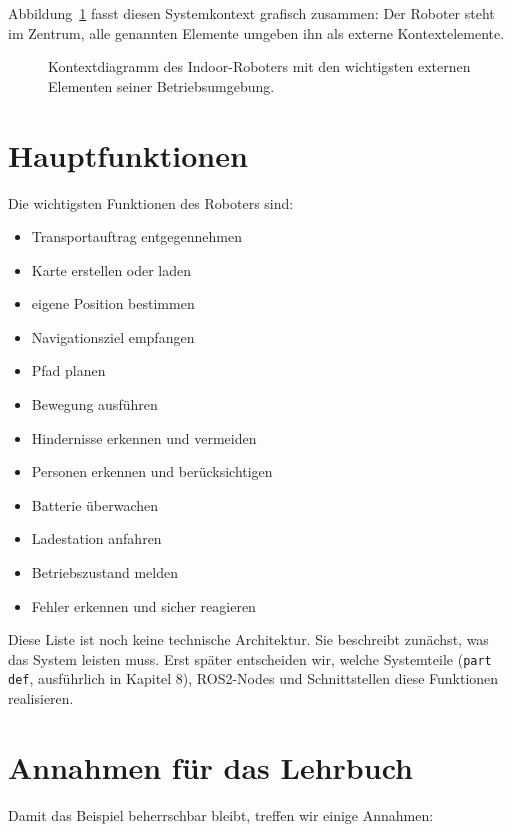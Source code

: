 Abbildung~\ref{fig:kap05-kontextdiagramm} fasst diesen Systemkontext grafisch zusammen: Der Roboter steht im Zentrum, alle genannten Elemente umgeben ihn als externe Kontextelemente.

\begin{figure}[H]
  \centering
  \caption{Kontextdiagramm des Indoor-Roboters mit den wichtigsten externen Elementen seiner Betriebsumgebung.}
  \label{fig:kap05-kontextdiagramm}
\end{figure}

\section{Hauptfunktionen}
Die wichtigsten Funktionen des Roboters sind:

\begin{itemize}
    \item Transportauftrag entgegennehmen
    \item Karte erstellen oder laden
    \item eigene Position bestimmen
    \item Navigationsziel empfangen
    \item Pfad planen
    \item Bewegung ausführen
    \item Hindernisse erkennen und vermeiden
    \item Personen erkennen und berücksichtigen
    \item Batterie überwachen
    \item Ladestation anfahren
    \item Betriebszustand melden
    \item Fehler erkennen und sicher reagieren
\end{itemize}

Diese Liste ist noch keine technische Architektur. Sie beschreibt zunächst, was das System leisten muss. Erst später entscheiden wir, welche Systemteile (\texttt{part def}, ausführlich in Kapitel 8), ROS2-Nodes und Schnittstellen diese Funktionen realisieren.

\section{Annahmen für das Lehrbuch}
Damit das Beispiel beherrschbar bleibt, treffen wir einige Annahmen:

